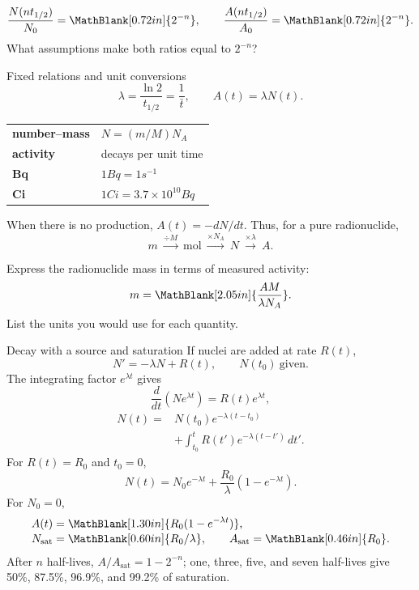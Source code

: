 \begin{handoutcolumns}
\begin{checkpoint}
\[
 \frac{N(nt_{1/2})}{N_0}=\MathBlank[0.72in]{2^{-n}},
 \qquad
 \frac{A(nt_{1/2})}{A_0}=\MathBlank[0.72in]{2^{-n}}.
\]
What assumptions make both ratios equal to $2^{-n}$?
\end{checkpoint}

\switchcolumn


\begin{fixedbox}{Fixed relations and unit conversions}
\[
 \boxed{\lambda=\frac{\ln 2}{t_{1/2}}=\frac{1}{\bar t}},
 \qquad
 \boxed{A(t)=\lambda N(t)}.
\]
\scriptsize
\begin{tabularx}{\linewidth}{@{}>{\bfseries}l X@{}}
number--mass & $N=(m/M)N_A$\\
activity & decays per unit time\\
Bq & $1\unit{Bq}=1\unit{s^{-1}}$\\
Ci & $1\unit{Ci}=3.7\times10^{10}\unit{Bq}$
\end{tabularx}
\normalsize
When there is no production, $A(t)=-dN/dt$. Thus, for a pure radionuclide,
\[
 m\ \xrightarrow{\div M}\ \mathrm{mol}
 \ \xrightarrow{\times N_A}\ N
 \ \xrightarrow{\times\lambda}\ A.
\]
\end{fixedbox}

\begin{checkpoint}
Express the radionuclide mass in terms of measured activity:
\[
 m=\MathBlank[2.05in]{\frac{AM}{\lambda N_A}}.
\]
List the units you would use for each quantity.
\end{checkpoint}


\begin{boardbox}{Decay with a source and saturation}
\footnotesize
If nuclei are added at rate $R(t)$,
\[
 \boxed{N'=-\lambda N+R(t)},\qquad N(t_0)\ \text{given}.
\]
The integrating factor $e^{\lambda t}$ gives
\[
 \frac{d}{dt}\!\left(Ne^{\lambda t}\right)=R(t)e^{\lambda t},
\]
\[
 \boxed{\begin{aligned}
 N(t)={}&N(t_0)e^{-\lambda(t-t_0)}\\[-2pt]
 &+\int_{t_0}^{t}R(t')e^{-\lambda(t-t')}\,dt'.
 \end{aligned}}
\]
For $R(t)=R_0$ and $t_0=0$,
\[
 \boxed{N(t)=N_0e^{-\lambda t}
 +\frac{R_0}{\lambda}\left(1-e^{-\lambda t}\right)}.
\]
For $N_0=0$,
\[
 \begin{aligned}
 A(t)&=\MathBlank[1.30in]{R_0(1-e^{-\lambda t})},\\[-2pt]
 N_{\mathrm{sat}}&=\MathBlank[0.60in]{R_0/\lambda},\qquad
 A_{\mathrm{sat}}=\MathBlank[0.46in]{R_0}.
 \end{aligned}
\]
After $n$ half-lives, $A/A_{\mathrm{sat}}=1-2^{-n}$; one, three, five, and
seven half-lives give 50\%, 87.5\%, 96.9\%, and 99.2\% of saturation.
\normalsize
\end{boardbox}

\end{handoutcolumns}

